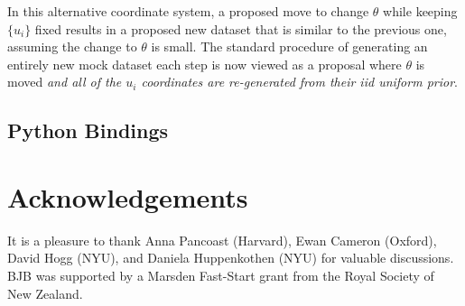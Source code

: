 \documentclass[article]{jss}
\newcommand{\params}{\theta}
\begin{document}
In this alternative coordinate system, a proposed move
to change $\params$ while keeping
$\{u_i\}$ fixed results in a proposed new dataset that is similar to the
previous one, assuming the change to $\params$ is small. The standard procedure
of generating an entirely new mock dataset each step is now viewed as a
proposal where $\params$ is moved {\it and all of the $u_i$ coordinates are
re-generated from their iid uniform prior}.

\subsection{Python Bindings}\label{sec:python_bindings}



\section*{Acknowledgements}
It is a pleasure to thank Anna Pancoast (Harvard),
Ewan Cameron (Oxford), David Hogg (NYU), and Daniela Huppenkothen (NYU)
for valuable discussions. BJB was supported by a Marsden Fast-Start grant
from the Royal Society of New Zealand.
\end{document}
